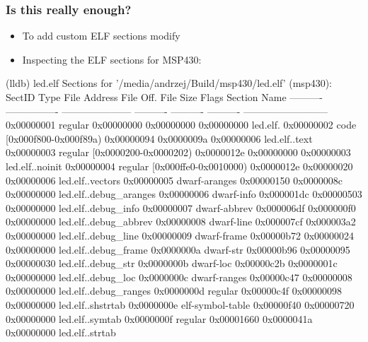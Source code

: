 \begin{frame}[fragile]
\frametitle{Is this really enough?}
\begin{itemize}
    \setlength\itemsep{1em}
    \item To add custom ELF sections modify 
    \item Inspecting the ELF sections for MSP430:
\end{itemize}
\begin{codebox2}
(lldb)  led.elf
Sections for '/media/andrzej/Build/msp430/led.elf' (msp430):
  SectID     Type             File Address           File Off.  File Size  Flags      Section Name
  ---------- ---------------- ---------------------  ---------- ---------- ---------- --------------------------
  0x00000001 regular                                 0x00000000 0x00000000 0x00000000 led.elf.
  0x00000002 code             [0x000f800-0x000f89a)  0x00000094 0x0000009a 0x00000006 led.elf..text
  0x00000003 regular          [0x0000200-0x0000202)  0x0000012e 0x00000000 0x00000003 led.elf..noinit
  0x00000004 regular          [0x000ffe0-0x0010000)  0x0000012e 0x00000020 0x00000006 led.elf..vectors
  0x00000005 dwarf-aranges                           0x00000150 0x0000008c 0x00000000 led.elf..debug_aranges
  0x00000006 dwarf-info                              0x000001dc 0x00000503 0x00000000 led.elf..debug_info
  0x00000007 dwarf-abbrev                            0x000006df 0x000000f0 0x00000000 led.elf..debug_abbrev
  0x00000008 dwarf-line                              0x000007cf 0x000003a2 0x00000000 led.elf..debug_line
  0x00000009 dwarf-frame                             0x00000b72 0x00000024 0x00000000 led.elf..debug_frame
  0x0000000a dwarf-str                               0x00000b96 0x00000095 0x00000030 led.elf..debug_str
  0x0000000b dwarf-loc                               0x00000c2b 0x0000001c 0x00000000 led.elf..debug_loc
  0x0000000c dwarf-ranges                            0x00000c47 0x00000008 0x00000000 led.elf..debug_ranges
  0x0000000d regular                                 0x00000c4f 0x00000098 0x00000000 led.elf..shstrtab
  0x0000000e elf-symbol-table                        0x00000f40 0x00000720 0x00000000 led.elf..symtab
  0x0000000f regular                                 0x00001660 0x0000041a 0x00000000 led.elf..strtab
\end{codebox2}
\end{frame}

